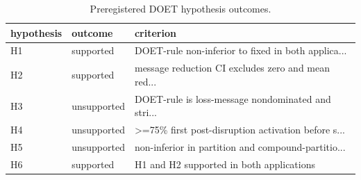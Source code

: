 \begin{table}
\centering
\caption{Preregistered DOET hypothesis outcomes.}
\begin{tabular}{lll}
\toprule
hypothesis &     outcome &                                          criterion \\
\midrule
        H1 &   supported & DOET-rule non-inferior to fixed in both applica... \\
        H2 &   supported & message reduction CI excludes zero and mean red... \\
        H3 & unsupported & DOET-rule is loss-message nondominated and stri... \\
        H4 & unsupported & >=75\% first post-disruption activation before s... \\
        H5 & unsupported & non-inferior in partition and compound-partitio... \\
        H6 &   supported &           H1 and H2 supported in both applications \\
\bottomrule
\end{tabular}
\end{table}
